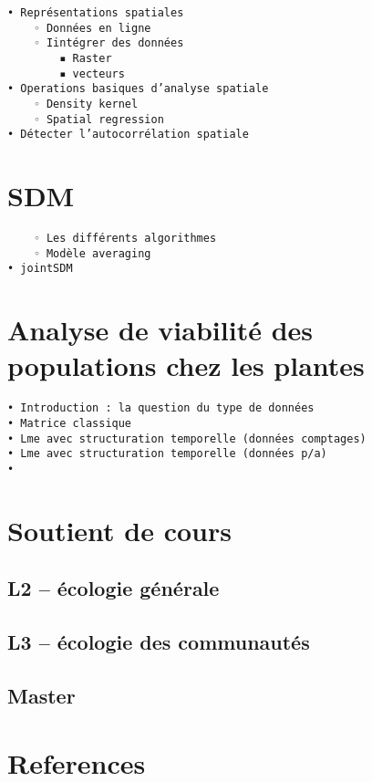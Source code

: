 \documentclass[
]{book}
\begin{document}
\begin{verbatim}
• Représentations spatiales
    ◦ Données en ligne
    ◦ Iintégrer des données
        ▪ Raster
        ▪ vecteurs
• Operations basiques d’analyse spatiale
    ◦ Density kernel
    ◦ Spatial regression
• Détecter l’autocorrélation spatiale
\end{verbatim}

\hypertarget{sdm}{%
\chapter{SDM}\label{sdm}}

\begin{verbatim}
    ◦ Les différents algorithmes 
    ◦ Modèle averaging
• jointSDM
\end{verbatim}

\hypertarget{analyse-de-viabilituxe9-des-populations-chez-les-plantes}{%
\chapter{Analyse de viabilité des populations chez les plantes}\label{analyse-de-viabilituxe9-des-populations-chez-les-plantes}}

\begin{verbatim}
• Introduction : la question du type de données
• Matrice classique
• Lme avec structuration temporelle (données comptages)
• Lme avec structuration temporelle (données p/a)
• 
\end{verbatim}

\hypertarget{soutient-de-cours}{%
\chapter{Soutient de cours}\label{soutient-de-cours}}

\hypertarget{l2-uxe9cologie-guxe9nuxe9rale}{%
\section{L2 -- écologie générale}\label{l2-uxe9cologie-guxe9nuxe9rale}}

\hypertarget{l3-uxe9cologie-des-communautuxe9s}{%
\section{L3 -- écologie des communautés}\label{l3-uxe9cologie-des-communautuxe9s}}

\hypertarget{master}{%
\section{Master}\label{master}}

\hypertarget{references}{%
\chapter{References}\label{references}}

  
\end{document}
